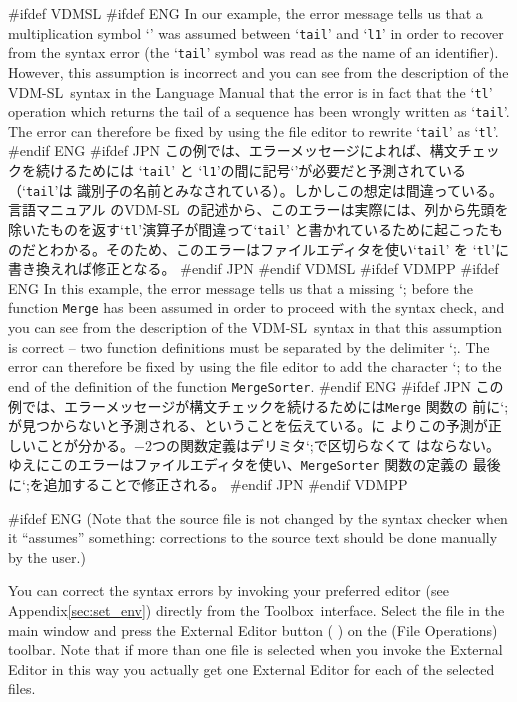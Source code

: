 \documentclass[\pformat,12pt]{article}
\newcommand{\vdmslpp}{VDM-SL}
\newcommand{\Toolbox}{Toolbox}
\newcommand{\vdmslpp}{VDM++}
\newcommand{\Toolbox}{Toolbox}
\newcommand{\Lit}[1]{`#1\Quote}
\newcommand{\aaa}{\tt }
\newcommand{\guicmd}[1]{{\sf #1}}
\newcommand{\guicmd}[1]{{\gt #1}}
\begin{document}
#ifdef VDMSL
#ifdef ENG
In our example, the error message tells us that a multiplication symbol
`{\tt*}' was assumed between `{\tt tail}' and `{\tt l1}' in order to
recover from the syntax error (the `{\tt tail}' symbol was read as the
name of an identifier). However, this assumption is incorrect and  you
can see from the  description of the \vdmslpp\ syntax in the Language
Manual\cite{LangMan-CSK} that the error is in fact that the `{\tt tl}'
operation which returns the tail of a sequence has been wrongly
written as `{\tt tail}'. The error can therefore be fixed by using the
file editor to rewrite `{\tt tail}' as `{\tt tl}'.
#endif ENG
#ifdef JPN
この例では、エラーメッセージによれば、構文チェックを続けるためには
`{\tt tail}' と `{\tt l1}'の間に記号`{\tt*}'が必要だと予測されている（`{\tt tail}'は
識別子の名前とみなされている）。しかしこの想定は間違っている。言語マニュアル\cite{LangMan-CSK} 
の\vdmslpp\ の記述から、このエラーは実際には、列から先頭を除いたものを返す`{\tt tl}'演算子が間違って`{\tt tail}'
と書かれているために起こったものだとわかる。そのため、このエラーはファイルエディタを使い`{\tt tail}' を `{\tt tl}'に
書き換えれば修正となる。
#endif JPN
#endif VDMSL
#ifdef VDMPP
#ifdef ENG
In this example, the error message tells us that a missing \Lit{;}
before the function {\aaa Merge} has been assumed in order to proceed
with the syntax check, and you can see from the  description of the
\vdmslpp\ syntax in \cite{LangManPP-CSK} that this assumption is correct
-- two function definitions must be separated by the delimiter
\Lit{;}. The error can therefore be fixed by using the file editor to
add the character \Lit{;} to the end of the definition of the function
{\aaa MergeSorter}.
#endif ENG
#ifdef JPN
この例では、エラーメッセージが構文チェックを続けるためには{\aaa Merge} 関数の
前に\Lit{;}が見つからないと予測される、ということを伝えている。\cite{LangManPP-CSK}に
よりこの予測が正しいことが分かる。−2つの関数定義はデリミタ\Lit{;}で区切らなくて
はならない。ゆえにこのエラーはファイルエディタを使い、{\aaa MergeSorter} 関数の定義の
最後に\Lit{;}を追加することで修正される。
#endif JPN
#endif VDMPP

#ifdef ENG
(Note that the source file is not  changed by the syntax checker when
it ``assumes'' something: corrections to the source text should be
done manually by the user.)

You can correct the syntax errors by invoking your preferred editor
(see Appendix\ref{sec:set_env}) directly from the \Toolbox\
interface. Select the file  in the main window and 
press the \guicmd{External Editor}\index{External Editor} button (%
) 
on the (\guicmd{File Operations}) toolbar. Note that if more than
one file is selected when you invoke the \guicmd{External Editor} in
this way you actually get one \guicmd{External Editor} for each of the
selected files.
\end{document}
